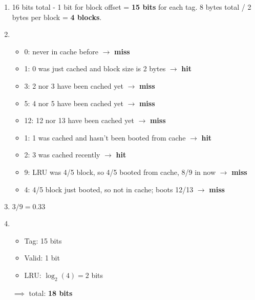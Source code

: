\begin{answer}
  \: \newline
  \begin{enumerate}
    \item 16 bits total - 1 bit for block offset = \textbf{15 bits} for each tag. 8 bytes total / 2 bytes per block = \textbf{4 blocks}.  
    \item
      \begin{itemize}
        \item 0: never in cache before \(\to\) \textbf{miss}
        \item 1: 0 was just cached and block size is 2 bytes \(\to\) \textbf{hit}
        \item 3: 2 nor 3 have been cached yet \(\to\) \textbf{miss}
        \item 5: 4 nor 5 have been cached yet \(\to\) \textbf{miss}
        \item 12: 12 nor 13 have been cached yet \(\to\) \textbf{miss}
        \item 1: 1 was cached and hasn't been booted from cache \(\to\) \textbf{hit}
        \item 2: 3 was cached recently \(\to\) \textbf{hit}
        \item 9: LRU was 4/5 block, so 4/5 booted from cache, 8/9 in now \(\to\) \textbf{miss}
        \item 4: 4/5 block just booted, so not in cache; boots 12/13 \(\to\) \textbf{miss}
      \end{itemize}
    \item \(3 / 9 = 0.33\)
    \item
      \begin{itemize}
        \item Tag: 15 bits
        \item Valid: 1 bit
        \item LRU: \(\log_2(4) = 2\) bits
      \end{itemize}
      \(\implies\) total: \textbf{18 bits}
  \end{enumerate}
\end{answer}

